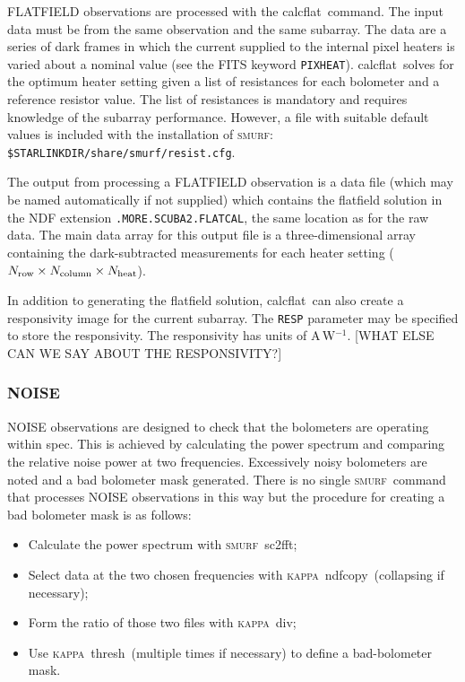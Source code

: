 \documentclass[twoside,11pt]{article}
\newcommand{\xref}[3]{#1}
\renewcommand{\_}{\texttt{\symbol{95}}}
\newcommand{\KAPPA}{\textsc{kappa}}
\newcommand{\SMURF}{\textsc{smurf}}
\newcommand{\task}[1]{\textsf{#1}}
\newcommand{\calcflat}{\xref{\task{calcflat}}{sun258}{CALCFLAT}}
\newcommand{\fft}{\xref{\task{sc2fft}}{sun258}{SC2FFT}}
\newcommand{\kapdiv}{\xref{\task{div}}{sun95}{DIV}}
\newcommand{\ndfcopy}{\xref{\task{ndfcopy}}{sun95}{NDFCOPY}}
\newcommand{\thresh}{\xref{\task{thresh}}{sun95}{THRESH}}
\begin{document}
FLATFIELD observations are processed with the \calcflat\ command. The
input data must be from the same observation and the same
subarray. The data are a series of dark frames in which the current
supplied to the internal pixel heaters is varied about a nominal value
(see the FITS keyword \texttt{PIXHEAT}). \calcflat\ solves for the
optimum heater setting given a list of resistances for each bolometer
and a reference resistor value. The list of resistances is mandatory
and requires knowledge of the subarray performance. However, a file
with suitable default values is included with the installation of
\SMURF: \texttt{\$STARLINK\_DIR/share/smurf/resist.cfg}.

The output from processing a FLATFIELD observation is a data file
(which may be named automatically if not supplied) which contains the
flatfield solution in the NDF extension \texttt{.MORE.SCUBA2.FLATCAL},
the same location as for the raw data. The main data array for this
output file is a three-dimensional array containing the
dark-subtracted measurements for each heater setting ($N_{\rm
  row}\times N_{\rm column} \times N_{\rm heat}$).

In addition to generating the flatfield solution, \calcflat\ can also
create a responsivity image for the current subarray. The
\texttt{RESP} parameter may be specified to store the
responsivity. The responsivity has units of A\,W$^{-1}$. [WHAT ELSE
CAN WE SAY ABOUT THE RESPONSIVITY?]

\subsubsection{NOISE}

NOISE observations are designed to check that the bolometers are
operating within spec. This is achieved by calculating the power
spectrum and comparing the relative noise power at two frequencies.
Excessively noisy bolometers are noted and a bad bolometer mask
generated. There is no single \SMURF\ command that processes NOISE
observations in this way but the procedure for creating a bad
bolometer mask is as follows:
\begin{itemize}
\item Calculate the power spectrum with \SMURF\ \fft;
\item Select data at the two chosen frequencies with \KAPPA\ \ndfcopy\
  (collapsing if necessary);
\item Form the ratio of those two files with \KAPPA\ \kapdiv;
\item Use \KAPPA\ \thresh\ (multiple times if necessary) to define a
  bad-bolometer mask.
\end{itemize}
\end{document}
